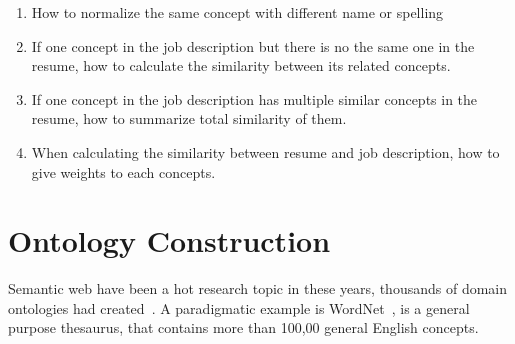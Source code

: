 \begin{enumerate}
    \item How to normalize the same concept with different name or spelling
    \item If one concept in the job description but there is no the same one in the resume, how to calculate the similarity between its related concepts.
    \item If one concept in the job description has multiple similar concepts in the resume, how to summarize total similarity of them.
    \item When calculating the similarity between resume and job description, how to give weights to each concepts.
\end{enumerate}

\section{Ontology Construction}

Semantic web have been a hot research topic in these years, thousands of domain ontologies had created~\cite{ding2004swoogle}. A paradigmatic example is WordNet~\cite{fellbaum1998wordnet}, is a general purpose thesaurus, that contains more than 100,00 general English concepts. 
 